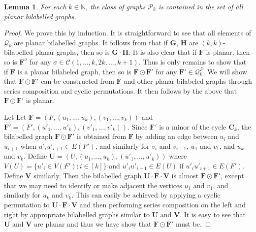 \documentclass[a4paper,onecolumn,11pt,accepted=2026-01-06]{quantumarticle}
\theoremstyle{plain}
\newtheorem{lem}[thm]{Lemma}
\theoremstyle{remark}
\theoremstyle{definition}
\def\calP{{\mathcal P}} \def\calQ{{\mathcal Q}} \def\calR{{\mathcal R}}
\newcommand{\cyclicpermutations}{\mathscr{C}(1,\dots, k, 2k, \dots, k+1)}
\begin{document}
\begin{lem}\label{lem:planar-class}
    For each $k \in \mathbb{N}$, the class of graphs $\calP_k$ is contained in the set of all planar bilabelled graphs. %
\end{lem}
\begin{proof}
    We prove this by induction. It is straightforward to see that all elements of $\calQ_k$ are planar bilabelled graphs. It follows from \cite[Lemma 5.12]{david-laura} that %
    if $\boldsymbol{G}$, $\boldsymbol{H}$ are $(k,k)$-bilabelled planar graphs, then so is $\boldsymbol{G} \cdot \boldsymbol{H}$. It is also clear that if $\boldsymbol{F}$ is planar, then so is $\boldsymbol{F}^\sigma$ for any $\sigma \in \cyclicpermutations$. Thus is only remains to show that if $\boldsymbol{F}$ is a planar bilabeled graph, then so is $\boldsymbol{F} \odot \boldsymbol{F}'$ for any $\boldsymbol{F}' \in \calQ_k^P$. We will show that $\boldsymbol{F} \odot \boldsymbol{F}'$ can be constructed from $\boldsymbol{F}$ and other planar bilabeled graphs through series composition and cyclic permutations. It then follows by the above that $\boldsymbol{F} \odot \boldsymbol{F}'$ is planar.

    Let Let $\boldsymbol{F} = (F,(u_1,\ldots, u_k),(v_1,\ldots,v_k))$ and $\boldsymbol{F}' = (F',(u'_1,\ldots, u'_k),(v'_1,\ldots,v'_k))$. Since $\boldsymbol{F}'$ is a minor of the cycle $\boldsymbol{C}_k$, the bilabelled graph $\boldsymbol{F} \odot \boldsymbol{F}'$ is obtained from $\boldsymbol{F}$ by adding an edge between $u_i$ and $u_{i+1}$ when $u'_iu'_{i+1} \in E(F')$, and similarly for $v_{i}$ and $v_{i+1}$, $u_1$ and $v_1$, and $u_k$ and $v_k$. Define $\boldsymbol{U} = (U,(u_1,\ldots,u_k),(u'_1,\ldots,u'_k))$ where $V(U) = \{u'_i \in V(F') : i \in [k]\}$ and $u'_iu'_{i+1} \in E(U)$ if $u'_iu'_{i+1} \in E(F')$. Define $\boldsymbol{V}$ similarly. Then the bilabelled graph $\boldsymbol{U} \cdot \boldsymbol{F} \cdot \boldsymbol{V}$ is almost $\boldsymbol{F} \odot \boldsymbol{F}'$, except that we may need to identify or make adjacent the vertices $u_1$ and $v_1$, and similarly for $u_k$ and $v_k$. This can easily be achieved by applying a cyclic permutation to $\boldsymbol{U} \cdot \boldsymbol{F} \cdot \boldsymbol{V}$ and then performing series composition on the left and right by appropriate bilabelled graphs similar to $\boldsymbol{U}$ and $\boldsymbol{V}$. It is easy to see that $\boldsymbol{U}$ and $\boldsymbol{V}$ are planar and thus we have show that $\boldsymbol{F} \odot \boldsymbol{F}'$ must be.



\end{proof}
\end{document}
